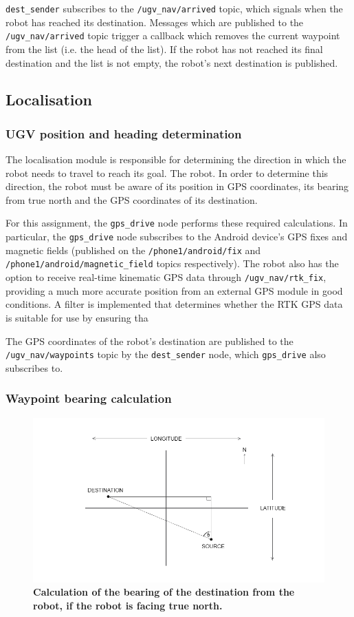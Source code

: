 \documentclass[titlepage,12pt,a4paper]{article}
\begin{document}
\verb|dest_sender| subscribes to the \verb|/ugv_nav/arrived| topic, which signals when the robot has reached its destination. Messages which are published to the \verb|/ugv_nav/arrived| topic trigger a callback which removes the current waypoint from the list (i.e. the head of the list). If the robot has not reached its final destination and the list is not empty, the robot's next destination is published.

\subsection{Localisation}

\subsubsection{UGV position and heading determination}
The localisation module is responsible for determining the direction in which the robot needs to travel to reach its goal. The robot. In order to determine this direction, the robot must be aware of its position in GPS coordinates, its bearing from true north and the GPS coordinates of its destination.

For this assignment, the \verb|gps_drive| node performs these required calculations. In particular, the \verb|gps_drive| node subscribes to the Android device's GPS fixes and magnetic fields (published on the \verb|/phone1/android/fix| and \verb|/phone1/android/magnetic_field| topics respectively). The robot also has the option to receive real-time kinematic GPS data through \verb|/ugv_nav/rtk_fix|, providing a much more accurate position from an external GPS module in good conditions. A filter is implemented that determines whether the RTK GPS data is suitable for use by ensuring tha

The GPS coordinates of the robot's destination are published to the  \verb|/ugv_nav/waypoints| topic by the \verb|dest_sender| node, which \verb|gps_drive| also subscribes to.

\subsubsection{Waypoint bearing calculation}
\begin{figure}[h]
	\centering
	\includegraphics[scale=0.6]{figures/bearings.png}
	\caption{\textbf{Calculation of the bearing of the destination from the robot, if the robot is facing true north.}}
	\label{figure:bearing1}
\end{figure}
\end{document}
